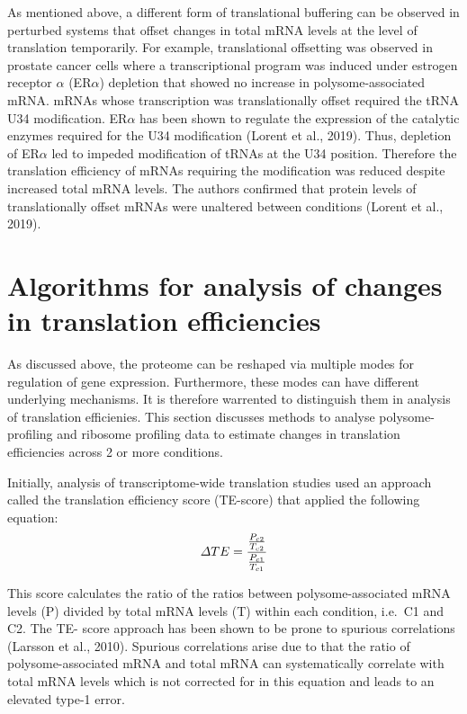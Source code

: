 \documentclass[12pt,openany]{book}
\begin{document}
As mentioned above, a different form of translational buffering can be
observed in perturbed systems that offset changes in total mRNA levels
at the level of translation temporarily. For example, translational
offsetting was observed in prostate cancer cells where a transcriptional
program was induced under estrogen receptor \(\alpha\) (ER\(\alpha\))
depletion that showed no increase in polysome-associated mRNA. mRNAs
whose transcription was translationally offset required the tRNA U34
modification. ER\(\alpha\) has been shown to regulate the expression of
the catalytic enzymes required for the U34 modification (Lorent et al.,
2019). Thus, depletion of ER\(\alpha\) led to impeded modification of
tRNAs at the U34 position. Therefore the translation efficiency of mRNAs
requiring the modification was reduced despite increased total mRNA
levels. The authors confirmed that protein levels of translationally
offset mRNAs were unaltered between conditions (Lorent et al., 2019).
\newline
\section{Algorithms for analysis of changes in translation efficiencies}\label{algorithm}

As discussed above, the proteome can be reshaped via multiple modes for
regulation of gene expression. Furthermore, these modes can have
different underlying mechanisms. It is therefore warrented to
distinguish them in analysis of translation efficienies. This section
discusses methods to analyse polysome-profiling and ribosome profiling
data to estimate changes in translation efficiencies across 2 or more
conditions.

Initially, analysis of transcriptome-wide translation studies used an
approach called the translation efficiency score (TE-score) that applied
the following equation:
\[\varDelta TE = \frac{\frac{P_{c2}}{T_{c2}}} {\frac{P_{c1}}{T_{c1}}}\\\]

This score calculates the ratio of the ratios between
polysome-associated mRNA levels (P) divided by total mRNA levels (T)
within each condition, i.e.~C1 and C2. The TE- score approach has been
shown to be prone to spurious correlations (Larsson et al., 2010).
Spurious correlations arise due to that the ratio of polysome-associated
mRNA and total mRNA can systematically correlate with total mRNA levels
which is not corrected for in this equation and leads to an elevated
type-1 error.
\end{document}

